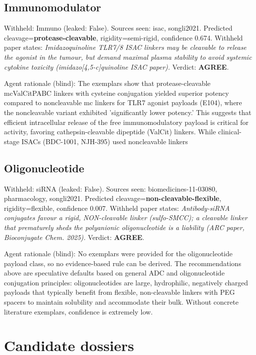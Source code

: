 \documentclass[10pt]{article}
\begin{document}
\subsection{Immunomodulator}
Withheld: Immuno (leaked: False). Sources seen: isac, songli2021. Predicted cleavage=\textbf{protease-cleavable}, rigidity=semi-rigid, confidence 0.674. Withheld paper states: \emph{Imidazoquinoline TLR7/8 ISAC linkers may be cleavable to release the agonist in the tumour, but demand maximal plasma stability to avoid systemic cytokine toxicity (imidazo[4,5-c]quinoline ISAC paper).} Verdict: \textbf{AGREE}.

Agent rationale (blind): The exemplars show that protease-cleavable mcValCitPABC linkers with cysteine conjugation yielded superior potency compared to noncleavable mc linkers for TLR7 agonist payloads (E104), where the noncleavable variant exhibited 'significantly lower potency.' This suggests that efficient intracellular release of the free immunomodulatory payload is critical for activity, favoring cathepsin-cleavable dipeptide (ValCit) linkers. While clinical-stage ISACs (BDC-1001, NJH-395) used noncleavable linkers
\subsection{Oligonucleotide}
Withheld: siRNA (leaked: False). Sources seen: biomedicines-11-03080, pharmacology, songli2021. Predicted cleavage=\textbf{non-cleavable-flexible}, rigidity=flexible, confidence 0.007. Withheld paper states: \emph{Antibody-siRNA conjugates favour a rigid, NON-cleavable linker (sulfo-SMCC); a cleavable linker that prematurely sheds the polyanionic oligonucleotide is a liability (ARC paper, Bioconjugate Chem. 2025).} Verdict: \textbf{AGREE}.

Agent rationale (blind): No exemplars were provided for the oligonucleotide payload class, so no evidence-based rule can be derived. The recommendations above are speculative defaults based on general ADC and oligonucleotide conjugation principles: oligonucleotides are large, hydrophilic, negatively charged payloads that typically benefit from flexible, non-cleavable linkers with PEG spacers to maintain solubility and accommodate their bulk. Without concrete literature exemplars, confidence is extremely low.
\section{Candidate dossiers}
\end{document}
